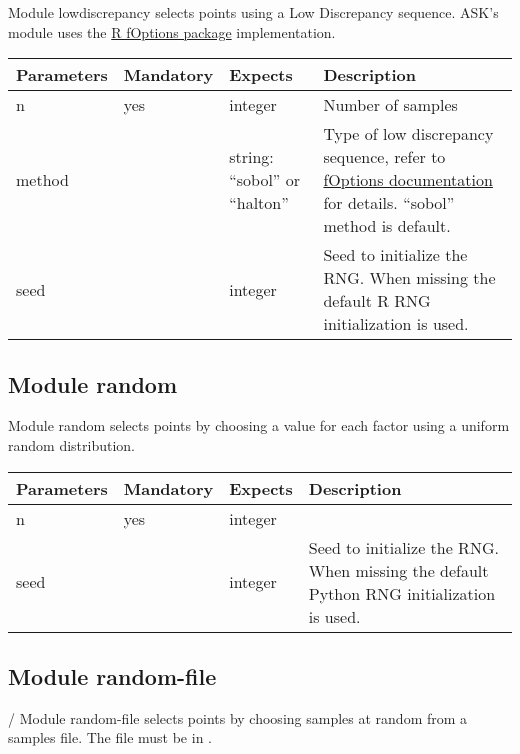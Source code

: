 Module lowdiscrepancy selects points using a Low Discrepancy sequence. ASK's module uses the \href{http://cran.r-project.org/web/packages/fOptions/}{R fOptions package} implementation.

	\vspace{0.5cm}\begin{tabular}{| p{} | p{} | p{} | p{}  |}
		\hline
		\textbf{ Parameters} & \textbf{ Mandatory} & \textbf{ Expects} & \textbf{ Description} \\ \hline
		 n &  yes &  integer &  Number of samples \\ \hline
		 method &   &  string: ``sobol'' or ``halton'' &  Type of low discrepancy sequence, refer to \href{http://cran.r-project.org/web/packages/fOptions/}{fOptions documentation} for details. ``sobol'' method is default. \\ \hline
		 seed &   &  integer &  Seed to initialize the RNG. When missing the default R RNG initialization is used. \\ \hline
	\end{tabular}

\subsection{Module random}

Module random selects points by choosing a value for each factor using a uniform random distribution. 

	\vspace{0.5cm}\begin{tabular}{| p{} | p{} | p{} | p{}  |}
		\hline
		\textbf{ Parameters} & \textbf{ Mandatory} & \textbf{ Expects} & \textbf{ Description} \\ \hline
		 n &  yes &  integer & \\ \hline
		 seed &   &  integer &  Seed to initialize the RNG. When missing the default Python RNG initialization is used. \\ \hline
	\end{tabular}

\subsection{Module random-file}
/
Module random-file selects points by choosing samples at random from a samples file. The file must be in .

